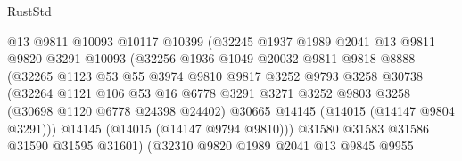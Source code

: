 \begin{lexlean}{RustStd}
\begin{coremodule}
                              @13
                              @9811
                              @10093
                              @10117
                              @10399
                              (@32245
                                @1937
                                @1989
                                @2041
                                @13
                                @9811
                                @9820
                                @3291
                                @10093
                                (@32256
                                  @1936
                                  @1049
                                  @20032
                                  @9811
                                  @9818
                                  @8888
                                  (@32265
                                    @1123
                                    @53
                                    @55
                                    @3974
                                    @9810
                                    @9817
                                    @3252
                                    @9793
                                    @3258
                                    @30738
                                    (@32264
                                      @1121
                                      @106
                                      @53
                                      @16
                                      @6778
                                      @3291
                                      @3271
                                      @3252
                                      @9803
                                      @3258
                                      (@30698 @1120 @6778 @24398 @24402)
                                      @30665
                                      @14145
                                      (@14015 (@14147 @9804 @3291)))
                                    @14145
                                    (@14015 (@14147 @9794 @9810)))
                                  @31580
                                  @31583
                                  @31586
                                  @31590
                                  @31595
                                  @31601)
                                (@32310
                                  @9820
                                  @1989
                                  @2041
                                  @13
                                  @9845
                                  @9955

\end{coremodule}
\end{lexlean}
